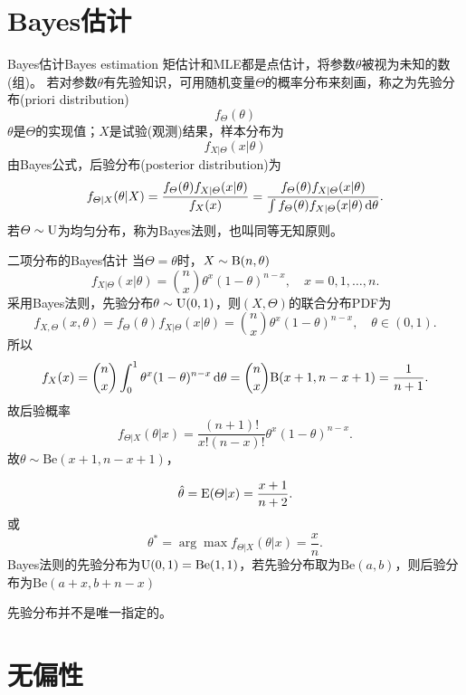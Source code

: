 \section{Bayes估计}

\begin{definition}
	{Bayes估计}{Bayes estimation}
	矩估计和MLE都是点估计，将参数$\theta$被视为未知的数(组)。
	若对参数$\theta$有先验知识，可用随机变量$\varTheta$的概率分布来刻画，称之为先验分布(priori distribution)
	\[
		f_\varTheta(\theta)
	\]
	$\theta$是$\varTheta$的实现值；$X$是试验(观测)结果，样本分布为
	\[
		f_{X|\varTheta}(x|\theta)
	\]
	由Bayes公式，后验分布(posterior distribution)为
	\begin{equation}
		f_{\varTheta|X}(\theta|X)=\frac{f_\varTheta(\theta)f_{X|\varTheta}(x|\theta)}{f_X(x)}=\frac{f_\varTheta(\theta)f_{X|\varTheta}(x|\theta)}{\textstyle\int f_\varTheta(\theta)f_{X|\varTheta}(x|\theta)\mathop{}\!\mathrm{d}\theta}.
	\end{equation}
	若$\varTheta\sim\operatorname{U}$为均匀分布，称为Bayes法则，也叫同等无知原则。
\end{definition}

\begin{example}{二项分布的Bayes估计}{}
	当$\varTheta=\theta$时，$X\sim\operatorname{B}(n,\theta)$
	\[
		f_{X|\varTheta}(x|\theta)=\binom nx\theta^x(1-\theta)^{n-x},\quad x=0,1,\ldots,n.
	\]
	采用Bayes法则，先验分布$\theta\sim\operatorname{U}(0,1)$，则$(X,\varTheta)$的联合分布PDF为
	\[
		f_{X,\varTheta}(x,\theta)=f_{\varTheta}(\theta)f_{X|\varTheta}(x|\theta)=\binom nx\theta^x(1-\theta)^{n-x},\quad\theta\in(0,1).
	\]
	所以
	\[
		f_X(x)=\binom nx\int_0^1\theta^x(1-\theta)^{n-x}\mathop{}\!\mathrm{d}\theta=\binom nx\mathrm B(x+1,n-x+1)=\frac1{n+1}.
	\]
	故后验概率
	\[
		f_{\varTheta|X}(\theta|x)=\frac{(n+1)!}{x!(n-x)!}\theta^x(1-\theta)^{n-x}.
	\]
	故$\theta\sim\mathrm{Be}(x+1,n-x+1)$，
	
	\[
		\hat\theta=\operatorname{E}(\varTheta|x)=\frac{x+1}{n+2}.
	\]
	或
	\[
		\theta^\ast=\arg\max f_{\varTheta|X}(\theta|x)=\frac xn.
	\]
	\tcblower
	Bayes法则的先验分布为$\operatorname{U}(0,1)=\mathrm{Be}(1,1)$，若先验分布取为$\mathrm{Be}(a,b)$，则后验分布为$\mathrm{Be}(a+x,b+n-x)$
\end{example}

\begin{remark}
	先验分布并不是唯一指定的。
\end{remark}

\section{无偏性}

